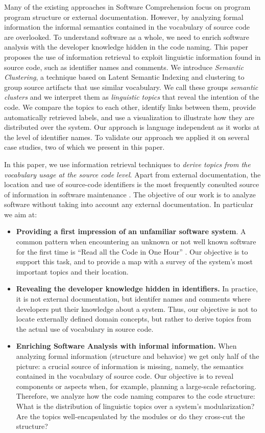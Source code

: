 \documentclass[10pt]{book}
\begin{document}
\asteriskasteriskasterisk

Many of the existing approaches in Software Comprehension focus on program program structure or external documentation. However, by analyzing formal information the informal semantics contained in the vocabulary of source code are overlooked. To understand software as a whole, we need to enrich software analysis with the developer knowledge hidden in the code naming. This paper proposes the use of information retrieval to exploit linguistic information found in source code, such as identifier names and comments. We introduce \emph{Semantic Clustering}, a technique based on Latent Semantic Indexing and clustering to group source artifacts that use similar vocabulary. We call these groups \emph{semantic clusters} and we interpret them as \emph{linguistic topics} that reveal the intention of the code. We compare the topics to each other, identify links between them, provide automatically retrieved labels, and use a visualization to illustrate how they are distributed over the system. Our approach is language independent as it works at the level of identifier names. To validate our approach we applied it on several case studies, two of which we present in this paper.

In this paper, we use information retrieval techniques to \emph{derive topics from the vocabulary usage at the source code level}. Apart from external documentation, the location and use of source-code identifiers is the most frequently consulted source of information in software maintenance \cite{Kosk04a}. The objective of our work is to analyze software without taking into account any external documentation. In particular we aim at:

\begin{itemize}
  \item \textbf{Providing a first impression of an unfamiliar software system}. A common pattern when encountering an unknown or not well known software for the first time is ``Read all the Code in One Hour'' \cite{Deme02a}. Our objective is to support this task, and to provide a map with a survey of the system's most important topics and their location.
  \item \textbf{Revealing the developer knowledge hidden in identifiers.} In practice, it is not external documentation, but identifer names and comments where developers put their knowledge about a system. Thus, our objective is not to locate externally defined domain concepts, but rather to derive topics from the actual use of vocabulary in source code.
  \item \textbf{Enriching Software Analysis with informal information.} When analyzing formal information (\eg structure and behavior) we get only half of the picture: a crucial source of information is missing, namely, the semantics contained in the vocabulary of source code. Our objective is to reveal components or aspects when, for example, planning a large-scale refactoring. Therefore, we analyze how the code naming compares to the code structure: What is the distribution of linguistic topics over a system's modularization? Are the topics well-encapsulated by the modules or do they cross-cut the structure?
\end{itemize}
\end{document}
